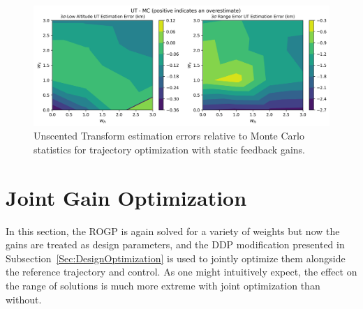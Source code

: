 \begin{figure}[h!]
	\centering
	\includegraphics[width=1\textwidth]{Images/Reestimated_WeightSweepError}
	\caption{Unscented Transform estimation errors relative to Monte Carlo statistics for trajectory optimization with static feedback gains.}
	\label{Fig:MCErrorsFixedGain}
\end{figure}

\section{Joint Gain Optimization}
In this section, the ROGP is again solved for a variety of weights but now the gains are treated as design parameters, and the DDP modification presented in Subsection~\ref{Sec:DesignOptimization} is used to jointly optimize them alongside the reference trajectory and control. As one might intuitively expect, the effect on the range of solutions is much more extreme with joint optimization than without. 

